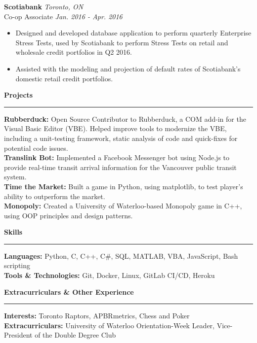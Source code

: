 \documentclass{letter}
\begin{document}
\begin{flushleft}
		{\large\textbf{Scotiabank}}  \hfill \textit{Toronto, ON} \\
		\vspace{1pt}
		Co-op Associate \hfill \textit{Jan. 2016 - Apr. 2016}
		\vspace{-9pt}
		\begin{itemize}
			\item Designed and developed database application to perform quarterly Enterprise Stress Tests, used by Scotiabank to perform Stress Tests on retail and wholesale credit portfolios in Q2 2016.\vspace{-3pt}
			\item Assisted with the modeling and projection of default rates of Scotiabank's domestic retail credit portfolios. 
		\end{itemize}
	\end{flushleft}

	\begin{flushleft}
		{\Large \textbf{Projects}}
		\rule[5pt]{\textwidth}{0.4pt}
		\textbf{Rubberduck:} Open Source Contributor to Rubberduck, a COM add-in for the Visual Basic Editor (VBE). Helped improve tools to modernize the VBE, including a unit-testing framework, static analysis of code and quick-fixes for potential code issues.\\
		\textbf{Translink Bot:} Implemented a Facebook Messenger bot using Node.js to provide real-time transit arrival information for the Vancouver public transit system.\\
		\textbf{Time the Market:} Built a game in Python, using matplotlib, to test player's ability to outperform the market.\\
		\textbf{Monopoly:} Created a University of Waterloo-based Monopoly game in C++, using OOP principles and design patterns.
	\end{flushleft}
	
	\begin{flushleft}
		{\Large \textbf{Skills}}
		\rule[5pt]{\textwidth}{0.4pt}
		\textbf{Languages:} Python, C, C++, C\#, SQL, MATLAB, VBA, JavaScript, Bash scripting\\
		\textbf{Tools \& Technologies:} Git, Docker, Linux, GitLab CI/CD, Heroku
	\end{flushleft}

	\begin{flushleft}
		{\Large \textbf{Extracurriculars \& Other Experience}}
		\rule[5pt]{\textwidth}{0.4pt}
		\textbf{Interests:} Toronto Raptors, APBRmetrics, Chess and Poker\\
		\textbf{Extracurriculars:} University of Waterloo Orientation-Week Leader, Vice-President of the Double Degree Club
	\end{flushleft}
\end{document}
